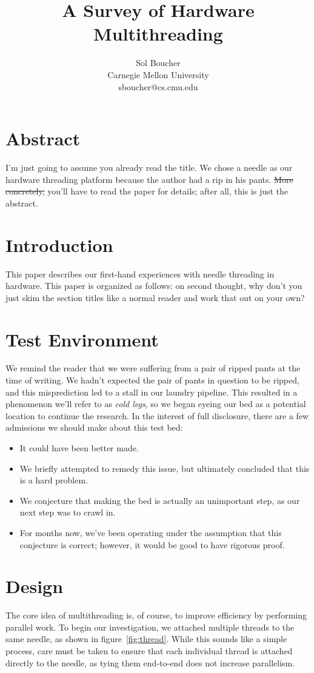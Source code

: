 \documentclass[letterpaper,twocolumn,12pt]{article}
\title{A Survey of Hardware Multithreading}
\author{Sol Boucher \\ Carnegie Mellon University \\ sboucher@cs.cmu.edu}
\date{}
\begin{document}
\maketitle
\thispagestyle{empty}

\section*{Abstract}
I'm just going to assume you already read the title.
We chose a needle as our hardware threading platform because the author had a rip in his pants.
\sout{More concretely,} you'll have to read the paper for details; after all, this is just the abstract.

\section{Introduction}
This paper describes our first-hand experiences with needle threading in hardware.
This paper is organized as follows:\@
on second thought, why don't you just skim the section titles like a normal reader and work that out on your own?

\section{Test Environment}
We remind the reader that we were suffering from a pair of ripped pants at the time of writing.
We hadn't expected the pair of pants in question to be ripped, and this misprediction led to a stall in our laundry pipeline.
This resulted in a phenomenon we'll refer to as \textit{cold legs}, so we began eyeing our bed as a potential location to continue the research.
In the interest of full disclosure, there are a few admissions we should make about this test bed:
\pagebreak
\begin{itemize}
\item It could have been better made.
\item We briefly attempted to remedy this issue, but ultimately concluded that this is a hard problem.
\item We conjecture that making the bed is actually an unimportant step, as our next step was to crawl in.
\item For months now, we've been operating under the assumption that this conjecture is correct; however, it would be good to have rigorous proof.
\end{itemize}

\section{Design}
The core idea of multithreading is, of course, to improve efficiency by performing parallel work.
To begin our investigation, we attached multiple threads to the same needle, as shown in figure~\ref{fig:thread}.
While this sounds like a simple process, care must be taken to ensure that each individual thread is attached directly to the needle, as tying them end-to-end does not increase parallelism.
\end{document}
